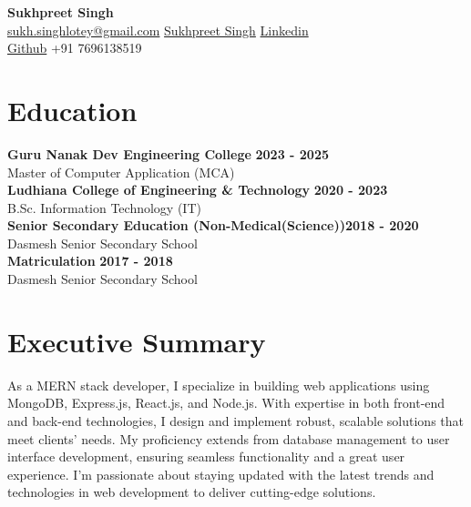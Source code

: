\documentclass[letterpaper, 11pt]{article}
\newcommand{\iconSpace}{\hspace{1px}}
\newcommand{\hSpace}{\hspace{8px}}
\newcommand{\secStartSpace}{\vspace{3pt}}
\newcommand{\secEndSpace}{\vspace{5pt}}
\newcommand{\spaceCollapse}{\vspace{-5pt}}
\begin{document}
\begin{center} 
	{\Large \textbf{Sukhpreet Singh}}\\
	\vspace{1px}
	{\footnotesize
		 \href{mailto:joesmith@gmail.com}{sukh.singhlotey@gmail.com} 
		\hSpace
		 \iconSpace \href{https://sukhlotey.github.io/imSukhpreet/}{Sukhpreet Singh} 
		\hSpace 
		 \hspace{.1px} \href{https://www.linkedin.com/in/sukhpreetlotey/}{Linkedin} 
		\hSpace
		}\\
	{\footnotesize
		 \iconSpace \href{https://github.com/sukhlotey}{Github}
		\hSpace 
		 \iconSpace
		+91 7696138519
	}
\end{center}
\spaceCollapse


\section{\color{blue} \textbf{Education}}
\secStartSpace

\begin{addmargin}[1em]{1em}
\textbf{Guru Nanak Dev Engineering College} \hfill \textbf{2023 - 2025}\\
        \setlength\parindent{1cm} Master of Computer Application (MCA)\\
	\textbf{Ludhiana College of Engineering & Technology} \hfill \textbf{2020 - 2023}\\
	\setlength\parindent{1cm} B.Sc. Information Technology (IT)\\
        \textbf{Senior Secondary Education (Non-Medical(Science))}\hfill \textbf{2018 - 2020}\\
        \setlength\parindent{1cm} Dasmesh Senior Secondary School\\
        \textbf{  Matriculation }\hfill \textbf{2017 - 2018}\\
        \setlength\parindent{1cm} Dasmesh Senior Secondary School\\
\end{addmargin}
\secEndSpace


\section{\color{blue} \textbf{Executive Summary}}
\secStartSpace
As a MERN stack developer, I specialize in building web applications using MongoDB, Express.js, React.js, and Node.js. With expertise in both front-end and back-end technologies, I design and implement robust, scalable solutions that meet clients' needs. My proficiency extends from database management to user interface development, ensuring seamless functionality and a great user experience. I'm passionate about staying updated with the latest trends and technologies in web development to deliver cutting-edge solutions.
\newline
\secEndSpace
\end{document}
